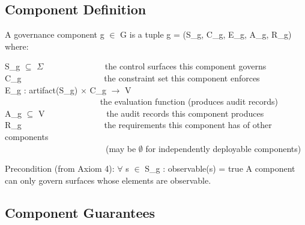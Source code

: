 \subsection{Component Definition}


\begin{cdef}
A governance component g $\in$ G is a tuple g = (S\_\allowbreak{}g, C\_\allowbreak{}g, E\_\allowbreak{}g, A\_\allowbreak{}g, R\_\allowbreak{}g) where:

\begin{cladnote}
S\_g $\subseteq$ $\Sigma$~~~~~~~~~~~~~~\textemdash{} the control surfaces this component governs\\
C\_g~~~~~~~~~~~~~~~~~~~\textemdash{} the constraint set this component enforces\\
E\_g : artifact(S\_g) $\times$ C\_g $\to$ V\\
~~~~~~~~~~~~~~~~~~~~~~\textemdash{} the evaluation function (produces audit records)\\
A\_g $\subseteq$ V~~~~~~~~~~~~~~\textemdash{} the audit records this component produces\\
R\_g~~~~~~~~~~~~~~~~~~~\textemdash{} the requirements this component has of other components\\
~~~~~~~~~~~~~~~~~~~~~~~~(may be $\emptyset$ for independently deployable components)\\
\end{cladnote}
Precondition (from Axiom 4): $\forall$ s $\in$ S\_\allowbreak{}g : observable(s) = true A component can only govern surfaces whose elements are observable.

\end{cdef}


\subsection{Component Guarantees}


